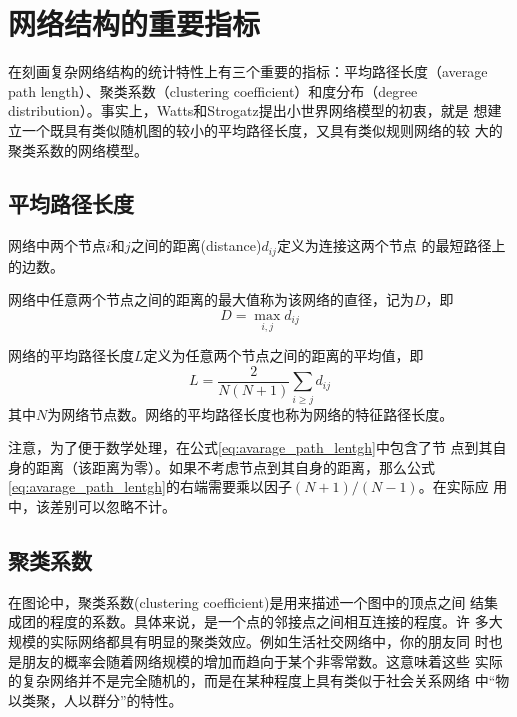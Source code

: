 \documentclass[oneside, phd]{njuthesis}
\begin{document}
\section{网络结构的重要指标}

在刻画复杂网络结构的统计特性上有三个重要的指标：平均路径长度（average
  path length）、聚类系数（clustering coefficient）和度分布（degree
  distribution）。事实上，Watts和Strogatz提出小世界网络模型的初衷，就是
想建立一个既具有类似随机图的较小的平均路径长度，又具有类似规则网络的较
大的聚类系数的网络模型。

\subsection{平均路径长度}

\begin{definition}[节点之间的距离]
网络中两个节点$i$和$j$之间的距离(distance)$d_{ij}$定义为连接这两个节点
的最短路径上的边数。
\end{definition}

\begin{definition}[直径]
网络中任意两个节点之间的距离的最大值称为该网络的直径，记为$D$，即
\begin{equation}\label{eq:dimension}
    D = \max_{i,j} d_{ij}
\end{equation}
\end{definition}

\begin{definition}[平均路径长度]
网络的平均路径长度$L$定义为任意两个节点之间的距离的平均值，即
\begin{equation}\label{eq:avarage_path_lentgh}
    L = \frac{2}{N(N+1)}\sum_{i\geq j}d_{ij}
\end{equation}
其中$N$为网络节点数。网络的平均路径长度也称为网络的特征路径长度。
\end{definition}

注意，为了便于数学处理，在公式\eqref{eq:avarage_path_lentgh}中包含了节
点到其自身的距离（该距离为零）。如果不考虑节点到其自身的距离，那么公式
\eqref{eq:avarage_path_lentgh}的右端需要乘以因子$(N+1)/(N-1)$。在实际应
用中，该差别可以忽略不计。

\subsection{聚类系数}

在图论中，聚类系数(clustering coefficient)是用来描述一个图中的顶点之间
结集成团的程度的系数。具体来说，是一个点的邻接点之间相互连接的程度。许
多大规模的实际网络都具有明显的聚类效应。例如生活社交网络中，你的朋友同
时也是朋友的概率会随着网络规模的增加而趋向于某个非零常数。这意味着这些
实际的复杂网络并不是完全随机的，而是在某种程度上具有类似于社会关系网络
中“物以类聚，人以群分”的特性。
\end{document}

